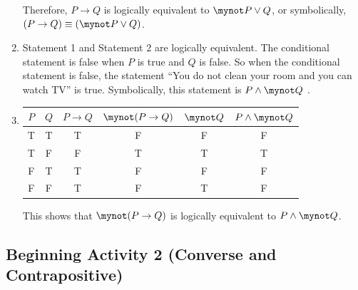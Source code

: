 \documentclass[11pt]{article}
\begin{document}
\begin{enumerate}
Therefore, $P \to Q$ is logically equivalent to  $\mynot  P \vee Q$, or symbolically,  
$( {P \to Q} ) \equiv ( {\mynot  P \vee Q} )$.

\item Statement 1 and Statement 2 are logically equivalent.  The conditional statement is false when $P$ is true and $Q$ is false.  So when the conditional statement is false, the statement ``You do not clean your room and you can watch TV'' is true.  Symbolically, this statement is $P \wedge \mynot Q$ . 

\item 
\begin{tabular}[t]{| c | c || c | c | c | c |}  \hline
$P$  &  $Q$  &  $P \to Q$  &  $\mynot ( {P \to Q} )$  &  $\mynot Q$ &  $P \wedge \mynot Q$ \\ \hline
T  &  T  &  T  &  F  &  F & F \\ \hline
T  &  F  &  F  &  T  &  T & T \\ \hline
F  &  T  &  T  &  F  &  F & F  \\ \hline
F  &  F  &  T  &  F  &  T & F \\ \hline
\end{tabular}

This shows that  $\mynot  ( {P \to Q} )$  is logically equivalent to  
$P \wedge \mynot  Q$.

\end{enumerate}
\hbreak


\newpage
\subsection*{ Beginning Activity 2 (Converse and Contrapositive)}
\end{document}
